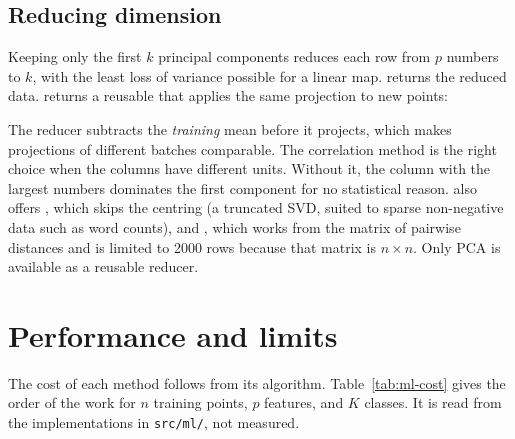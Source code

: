 \begin{codepairs}
\end{codepairs}

\subsection{Reducing dimension}
\label{ssec:ml-reduce}

Keeping only the first \(k\) principal components reduces each row from \(p\)
numbers to \(k\), with the least loss of variance possible for a linear map.
 returns the reduced data.  returns a
reusable  that applies the same projection to new
points:

\begin{codepairs}
\end{codepairs}

The reducer subtracts the \emph{training} mean before it projects, which makes
projections of different batches comparable. The correlation method is the right
choice when the columns have different units. Without it, the column with the
largest numbers dominates the first component for no statistical reason.
 also offers , which skips the
centring (a truncated SVD, suited to sparse non-negative data such as word counts),
and , which works from the matrix of pairwise
distances and is limited to 2000 rows because that matrix is \(n \times n\). Only
PCA is available as a reusable reducer.

\section{Performance and limits}
\label{sec:ml-performance}

The cost of each method follows from its algorithm. Table~\ref{tab:ml-cost} gives
the order of the work for \(n\) training points, \(p\) features, and \(K\)
classes. It is read from the implementations in \texttt{src/ml/}, not measured.

